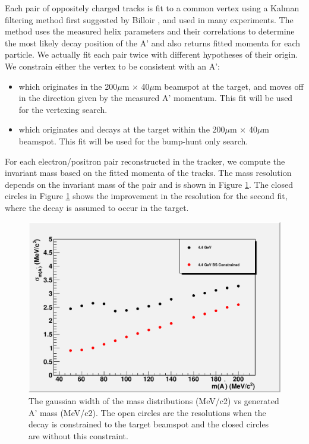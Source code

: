 Each pair of oppositely charged tracks is fit to a common vertex using a Kalman filtering 
method first suggested by Billoir \cite{bf}, \cite{bq} and used in many experiments.  The method 
uses the measured helix parameters and their correlations to determine the most likely 
decay position of the A' and also returns fitted momenta for each particle.  We actually 
fit each pair twice with different hypotheses of their origin.  We constrain either 
the vertex to be consistent with an A':

\begin{itemize}
\item which originates in the 200$\mu$m $\times$ 40$\mu$m beamspot at the target, and moves off 
in the direction given by the measured A' momentum.  This fit will be used for the vertexing search.  
\item which originates and decays at the target within the 200$\mu$m $\times$ 40$\mu$m beamspot.  
This fit will be used for the bump-hunt only search.  
\end{itemize}

For each electron/positron pair reconstructed in the tracker, we compute the invariant mass based 
on the fitted momenta of the tracks.  The mass resolution depends on the invariant mass of the pair 
and is shown in Figure \ref{fig:massres}.  The closed circles  in Figure \ref{fig:massres} shows the improvement 
in the resolution for the second fit, where the decay is assumed to occur in the target.  

\begin{figure}
\includegraphics[scale=0.8]{performance/tracking_performance/massRes-4pt4.pdf}
\caption{The gaussian width of the mass distributions (MeV/c2) vs generated A' mass (MeV/c2). 
 The open circles are the resolutions when the decay is constrained to the target beamspot 
and the closed circles are without this constraint.    }
\label{fig:massres}
\end{figure}



